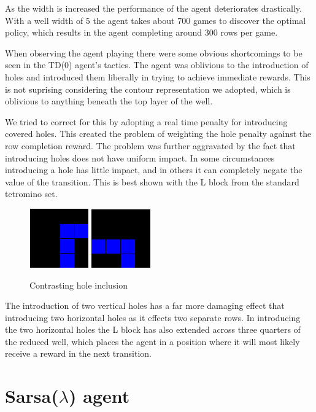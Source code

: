 \documentclass{rucsthesis}
\begin{document}
As the width is increased the performance of the agent deteriorates drastically. With a well width of 5 the agent takes about 700 games to discover the optimal policy, which results in the agent completing around 300 rows per game.

When observing the agent playing there were some obvious shortcomings to be seen in the TD(0) agent's tactics. The agent was oblivious to the introduction of holes and introduced them liberally in trying to achieve immediate rewards. This is not suprising considering the contour representation we adopted, which is oblivious to anything beneath the top layer of the well. 

We tried to correct for this by adopting a real time penalty for introducing covered holes. This created the problem of weighting the hole penalty against the row completion reward. The problem was further aggravated by the fact that introducing holes does not have uniform impact. In some circumstances introducing a hole has little impact, and in others it can completely negate the value of the transition. This is best shown with the L block from the standard tetromino set. 

\begin{figure}[h]
\centering
\includegraphics[width=1in]{worthless.png}
\includegraphics[width=1in]{notworthless.png}
\caption{Contrasting hole inclusion}
\label{fig:diffholes}
\end{figure}

The introduction of two vertical holes has a far more damaging effect that introducing two horizontal holes as it effects two separate rows. In introducing the two horizontal holes the L block has also extended across three quarters of the reduced well, which places the agent in a position where it will most likely receive a reward in the next transition.

\section{Sarsa($\lambda$) agent}
\end{document}
